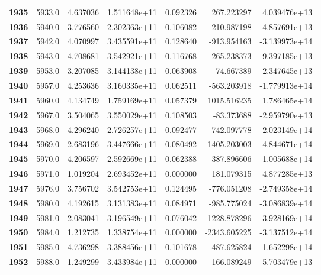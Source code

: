 \documentclass{report}[12pt]
\begin{document}
\begin{center}
\begin{tabular}{lrrrrrr}
\textbf{1935} &         5933.0 &   4.637036 &  1.511648e+11 &    0.092326 &   267.223297 &  4.039476e+13 \\
\textbf{1936} &         5940.0 &   3.776560 &  2.302363e+11 &    0.106082 &  -210.987198 & -4.857691e+13 \\
\textbf{1937} &         5942.0 &   4.070997 &  3.435591e+11 &    0.128640 &  -913.954163 & -3.139973e+14 \\
\textbf{1938} &         5943.0 &   4.708681 &  3.542921e+11 &    0.116768 &  -265.238373 & -9.397185e+13 \\
\textbf{1939} &         5953.0 &   3.207085 &  3.144138e+11 &    0.063908 &   -74.667389 & -2.347645e+13 \\
\textbf{1940} &         5957.0 &   4.253636 &  3.160335e+11 &    0.062511 &  -563.203918 & -1.779913e+14 \\
\textbf{1941} &         5960.0 &   4.134749 &  1.759169e+11 &    0.057379 &  1015.516235 &  1.786465e+14 \\
\textbf{1942} &         5967.0 &   3.504065 &  3.550029e+11 &    0.108503 &   -83.373688 & -2.959790e+13 \\
\textbf{1943} &         5968.0 &   4.296240 &  2.726257e+11 &    0.092477 &  -742.097778 & -2.023149e+14 \\
\textbf{1944} &         5969.0 &   2.683196 &  3.447666e+11 &    0.080492 & -1405.203003 & -4.844671e+14 \\
\textbf{1945} &         5970.0 &   4.206597 &  2.592669e+11 &    0.062388 &  -387.896606 & -1.005688e+14 \\
\textbf{1946} &         5971.0 &   1.019204 &  2.693452e+11 &    0.000000 &   181.079315 &  4.877285e+13 \\
\textbf{1947} &         5976.0 &   3.756702 &  3.542753e+11 &    0.124495 &  -776.051208 & -2.749358e+14 \\
\textbf{1948} &         5980.0 &   4.192615 &  3.131383e+11 &    0.084971 &  -985.775024 & -3.086839e+14 \\
\textbf{1949} &         5981.0 &   2.083041 &  3.196549e+11 &    0.076042 &  1228.878296 &  3.928169e+14 \\
\textbf{1950} &         5984.0 &   1.212735 &  1.338754e+11 &    0.000000 & -2343.605225 & -3.137512e+14 \\
\textbf{1951} &         5985.0 &   4.736298 &  3.388456e+11 &    0.101678 &   487.625824 &  1.652298e+14 \\
\textbf{1952} &         5988.0 &   1.249299 &  3.433984e+11 &    0.000000 &  -166.089249 & -5.703479e+13 \\

\end{tabular}
\end{center}
\end{document}
